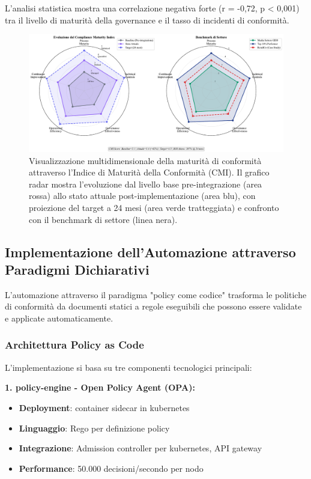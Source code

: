 L'analisi statistica mostra una correlazione negativa forte (r = -0,72, p < 0,001) tra il livello di maturità della \gls{governance} e il tasso di incidenti di conformità.

\begin{figure}[htbp]
\centering
\includegraphics[width=\textwidth]{thesis_figures/cap4/figura_4_2_cmi_radar.pdf}
\caption{Visualizzazione multidimensionale della maturità di conformità attraverso l'Indice di Maturità della Conformità (CMI). Il grafico radar mostra l'evoluzione dal livello base pre-integrazione (area rossa) allo stato attuale post-implementazione (area blu), con proiezione del target a 24 mesi (area verde tratteggiata) e confronto con il benchmark di settore (linea nera).}
\label{fig:cmi_radar}
\end{figure}

\subsection{Implementazione dell'Automazione attraverso Paradigmi Dichiarativi}

L'automazione attraverso il paradigma "policy come codice" trasforma le politiche di conformità da documenti statici a regole eseguibili che possono essere validate e applicate automaticamente\autocite{Brynjolfsson2016}.

\subsubsection{Architettura Policy as Code}

L'implementazione si basa su tre componenti tecnologici principali:

\textbf{1. \gls{policy-engine} - Open Policy Agent (OPA):}
\begin{itemize}
    \item \textbf{Deployment}: \gls{container} sidecar in \gls{kubernetes}
    \item \textbf{Linguaggio}: Rego per definizione policy
    \item \textbf{Integrazione}: Admission controller per \gls{kubernetes}, API gateway
    \item \textbf{Performance}: 50.000 decisioni/secondo per nodo
\end{itemize}


